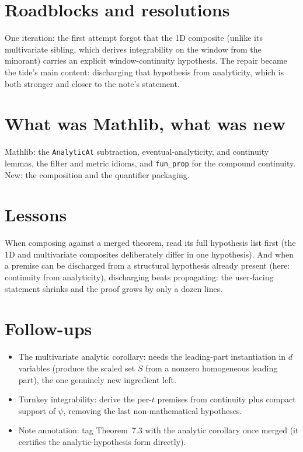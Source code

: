 \documentclass[11pt]{article}
\begin{document}
\section{Roadblocks and resolutions}

One iteration: the first attempt forgot that the 1D composite (unlike its
multivariate sibling, which derives integrability on the window from the
minorant) carries an explicit window-continuity hypothesis. The repair
became the tide's main content: discharging that hypothesis from
analyticity, which is both stronger and closer to the note's statement.

\section{What was Mathlib, what was new}

Mathlib: the \texttt{AnalyticAt} subtraction, eventual-analyticity, and
continuity lemmas, the filter and metric idioms, and \texttt{fun\_prop}
for the compound continuity. New: the composition and
the quantifier packaging.

\section{Lessons}

When composing against a merged theorem, read its full hypothesis list
first (the 1D and multivariate composites deliberately differ in one
hypothesis). And when a premise can be discharged from a structural
hypothesis already present (here: continuity from analyticity), discharging
beats propagating: the user-facing statement shrinks and the proof grows by
only a dozen lines.

\section{Follow-ups}

\begin{itemize}
\item The multivariate analytic corollary: needs the leading-part
instantiation in $d$ variables (produce the scaled set $S$ from a nonzero
homogeneous leading part), the one genuinely new ingredient left.
\item Turnkey integrability: derive the per-$t$ premises from continuity
plus compact support of $\psi$, removing the last non-mathematical
hypotheses.
\item Note annotation: tag Theorem~7.3 with the analytic corollary once
merged (it certifies the analytic-hypothesis form directly).
\end{itemize}
\end{document}
